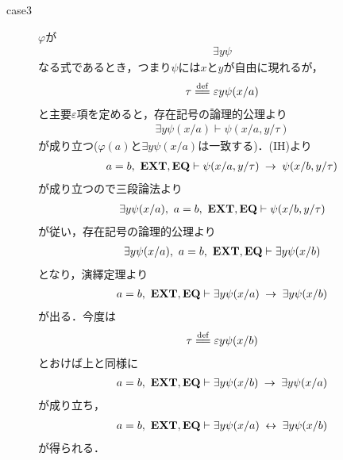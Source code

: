 \begin{sketch}
\begin{description}
\begin{description}
					\item[case3]
						$\varphi$が
						\begin{align}
							\exists y \psi
						\end{align}
						なる式であるとき，つまり$\psi$には$x$と$y$が自由に現れるが，
						\begin{align}
							\tau \defeq \varepsilon y \psi(x/a)
						\end{align}
						と主要$\varepsilon$項を定めると，存在記号の論理的公理より
						\begin{align}
							\exists y \psi(x/a) \vdash \psi(x/a,y/\tau)
						\end{align}
						が成り立つ($\varphi(a)$と$\exists y \psi(x/a)$は一致する)．(IH)より
						\begin{align}
							a = b,\ \mbox{{\bf EXT}},\mbox{{\bf EQ}} \vdash 
							\psi(x/a,y/\tau) \hspace{0.25em}\rightarrow\hspace{0.25em} \psi(x/b,y/\tau)
						\end{align}
						が成り立つので三段論法より
						\begin{align}
							\exists y \psi(x/a),\ a = b,\ \mbox{{\bf EXT}},\mbox{{\bf EQ}} \vdash 
							\psi(x/b,y/\tau)
						\end{align}
						が従い，存在記号の論理的公理より
						\begin{align}
							\exists y \psi(x/a),\ a = b,\ \mbox{{\bf EXT}},\mbox{{\bf EQ}} \vdash 
							\exists y \psi(x/b)
						\end{align}
						となり，演繹定理より
						\begin{align}
							a = b,\ \mbox{{\bf EXT}},\mbox{{\bf EQ}} \vdash 
							\exists y \psi(x/a) \hspace{0.25em}\rightarrow\hspace{0.25em} \exists y \psi(x/b)
						\end{align}
						が出る．今度は
						\begin{align}
							\tau \defeq \varepsilon y \psi(x/b)
						\end{align}
						とおけば上と同様に
						\begin{align}
							a = b,\ \mbox{{\bf EXT}},\mbox{{\bf EQ}} \vdash 
							\exists y \psi(x/b) \hspace{0.25em}\rightarrow\hspace{0.25em} \exists y \psi(x/a)
						\end{align}
						が成り立ち，
						\begin{align}
							a = b,\ \mbox{{\bf EXT}},\mbox{{\bf EQ}} \vdash 
							\exists y \psi(x/a) \hspace{0.25em}\leftrightarrow\hspace{0.25em} \exists y \psi(x/b)
						\end{align}
						が得られる．
						

\end{description}
\end{description}
\end{sketch}
